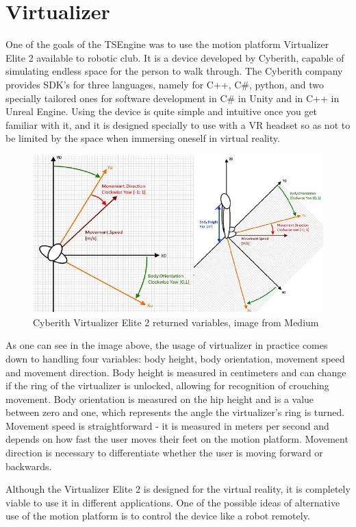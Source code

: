 \newpage
\section{Virtualizer}
\label{sec:virtualizer}
\hspace{\parindent}
One of the goals of the TSEngine was to use the motion platform Virtualizer Elite 2 available to robotic club. It is a device developed by Cyberith, capable of simulating endless space for the person to walk through. The Cyberith company provides SDK's for three languages, namely for C++, C\#, python, and two specially tailored ones for software development in C\# in Unity and in C++ in Unreal Engine. Using the device is quite simple and intuitive once you get familiar with it, and it is designed specially to use with a VR headset so as not to be limited by the space when immersing oneself in virtual reality. 
\begin{figure}[H]
  \includegraphics[width=\linewidth]{figures/cyberith_variables.jpg}
  \caption{Cyberith Virtualizer Elite 2 returned variables, image from Medium\cite{virtualizer_variables}}
\end{figure}
As one can see in the image above, the usage of virtualizer in practice comes down to handling four variables: body height, body orientation, movement speed and movement direction. Body height is measured in centimeters and can change if the ring of the virtualizer is unlocked, allowing for recognition of crouching movement. Body orientation is measured on the hip height and is a value between zero and one, which represents the angle the virtualizer's ring is turned. Movement speed is straightforward - it is measured in meters per second and depends on how fast the user moves their feet on the motion platform. Movement direction is  necessary to differentiate whether the user is moving forward or backwards.

Although the Virtualizer Elite 2 is designed for the virtual reality, it is completely viable to use it in different applications. One of the possible ideas of alternative use of the motion platform is to control the device like a robot remotely.
